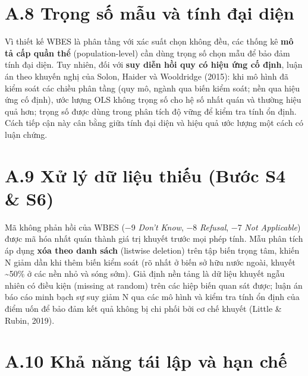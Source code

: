 \documentclass[
  a4paper,
  13pt]{extreport}
\begin{document}
\hypertarget{a.8-trux1ecdng-sux1ed1-mux1eabu-vuxe0-tuxednh-ux111ux1ea1i-diux1ec7n}{%
\section{A.8 Trọng số mẫu và tính đại
diện}\label{a.8-trux1ecdng-sux1ed1-mux1eabu-vuxe0-tuxednh-ux111ux1ea1i-diux1ec7n}}

Vì thiết kế WBES là phân tầng với xác suất chọn không đều, các thống kê
\textbf{mô tả cấp quần thể} (population-level) cần dùng trọng số chọn
mẫu để bảo đảm tính đại diện. Tuy nhiên, đối với \textbf{suy diễn hồi
quy có hiệu ứng cố định}, luận án theo khuyến nghị của Solon, Haider và
Wooldridge (2015): khi mô hình đã kiểm soát các chiều phân tầng (quy mô,
ngành qua biến kiểm soát; nền qua hiệu ứng cố định), ước lượng OLS không
trọng số cho hệ số nhất quán và thường hiệu quả hơn; trọng số được dùng
trong phân tích độ vững để kiểm tra tính ổn định. Cách tiếp cận này cân
bằng giữa tính đại diện và hiệu quả ước lượng một cách có luận chứng.

\hypertarget{a.9-xux1eed-luxfd-dux1eef-liux1ec7u-thiux1ebfu-bux1b0ux1edbc-s4-s6}{%
\section{A.9 Xử lý dữ liệu thiếu (Bước S4 \&
S6)}\label{a.9-xux1eed-luxfd-dux1eef-liux1ec7u-thiux1ebfu-bux1b0ux1edbc-s4-s6}}

Mã không phản hồi của WBES (−9 \emph{Don't Know}, −8 \emph{Refusal}, −7
\emph{Not Applicable}) được mã hóa nhất quán thành giá trị khuyết trước
mọi phép tính. Mẫu phân tích áp dụng \textbf{xóa theo danh sách}
(listwise deletion) trên tập biến trọng tâm, khiến N giảm dần khi thêm
biến kiểm soát (rõ nhất ở biến sở hữu nước ngoài, khuyết
\textasciitilde50\% ở các nền nhỏ và sóng sớm). Giả định nền tảng là dữ
liệu khuyết ngẫu nhiên có điều kiện (missing at random) trên các hiệp
biến quan sát được; luận án báo cáo minh bạch sự suy giảm N qua các mô
hình và kiểm tra tính ổn định của điểm uốn để bảo đảm kết quả không bị
chi phối bởi cơ chế khuyết (Little \& Rubin, 2019).

\hypertarget{a.10-khux1ea3-nux103ng-tuxe1i-lux1eadp-vuxe0-hux1ea1n-chux1ebf}{%
\section{A.10 Khả năng tái lập và hạn
chế}\label{a.10-khux1ea3-nux103ng-tuxe1i-lux1eadp-vuxe0-hux1ea1n-chux1ebf}}
\end{document}
